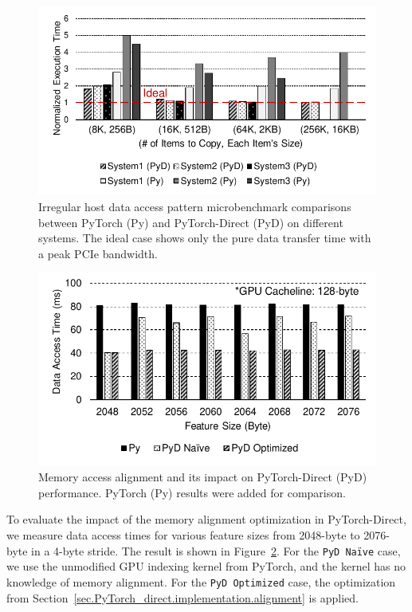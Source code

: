 \begin{figure}[]
    \centering
    \includegraphics[width=0.85\linewidth]{figures/PyDArXiv/microbench_vs.pdf}
    \caption{Irregular host data access pattern microbenchmark comparisons between PyTorch (Py) and PyTorch-Direct (PyD) on different systems. The ideal case shows only the pure data transfer time with a peak PCIe bandwidth.}
    \label{fig:micro_fig}
\end{figure}
\begin{figure}[]
    \centering
    \includegraphics[width=0.85\linewidth]{figures/PyDArXiv/alignment.pdf}
    \caption{Memory access alignment and its impact on PyTorch-Direct (PyD) performance. PyTorch (Py) results were added for comparison.}
    \label{fig:alignment}
\end{figure}

To evaluate the impact of the memory alignment optimization in PyTorch-Direct, we measure data access times for various feature sizes from 2048-byte to 2076-byte in a 4-byte stride.
The result is shown in Figure~\ref{fig:alignment}.
For the \texttt{PyD Naïve} case, we use the unmodified GPU indexing kernel from PyTorch, and the kernel has no knowledge of memory alignment.
For the \texttt{PyD Optimized} case, the optimization from Section~\ref{sec.PyTorch_direct.implementation.alignment} is applied.

